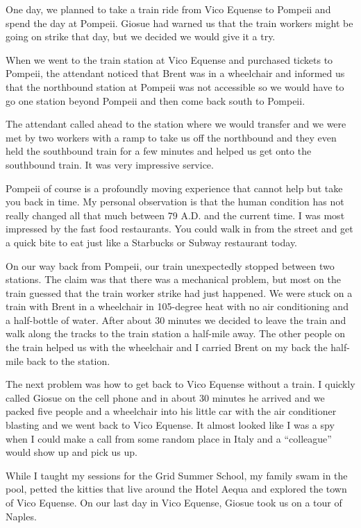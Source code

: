 \documentclass[12pt]{book}
\begin{document}
One day, we planned to take a train ride from
Vico Equense to Pompeii and spend the day at
Pompeii.  Giosue had warned us that the train
workers might be going on strike that day, but
we decided we would give it a try.

When we went to the train station at Vico Equense
and purchased tickets to Pompeii, the attendant
noticed that Brent was in a wheelchair and informed
us that the northbound station at Pompeii
was not accessible so we would have to go one station
beyond Pompeii and then come back south to Pompeii.

The attendant called ahead to the station where we would
transfer and we were met by two workers with a ramp
to take us off the northbound and they even held
the southbound train for a few minutes and helped us get onto
the southbound train.  It was very impressive service.

Pompeii of course is a profoundly moving experience
that cannot help but take you back in time.  My
personal observation is that the human condition
has not really changed all that much between 79 A.D. and
the current time.  I was most impressed by
the fast food restaurants.  You could walk in from the
street and get a quick bite to eat just like a Starbucks
or Subway restaurant today.

On our way back from Pompeii, our train
unexpectedly stopped
between two stations.  The claim was that
there was a mechanical problem, but most on the
train guessed that the train worker strike had just
happened.  We were stuck on a train with Brent
in a wheelchair in 105-degree heat with no air
conditioning and a half-bottle
of water.   After about 30 minutes we decided to leave
the train and walk along the tracks
to the train station a half-mile away.
The other people on the train helped us with the
wheelchair and I carried Brent on my back the half-mile
back to the station.

The next problem was how to get back to Vico Equense without
a train.  I quickly called Giosue on the cell phone and in
about 30 minutes he arrived and we packed five people
and a wheelchair into his little car with the air conditioner
blasting and we went back to Vico Equense.  It almost
looked like I was a spy when I could make a call
from some random place in Italy and a
``colleague'' would show up and pick us up.

While I taught my sessions for the Grid Summer School,
my family swam in the pool, petted the kitties that
live around the Hotel Aequa and explored the town
of Vico Equense.  On our last day in Vico Equense,
Giosue took us on a tour of Naples.
\end{document}
